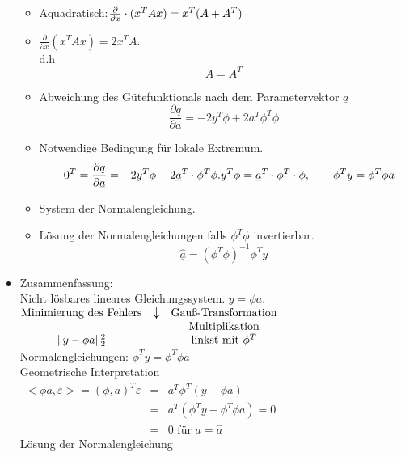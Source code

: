 \documentclass[ngerman]{tudscrreprt}
\begin{document}
\begin{itemize}
\begin{itemize}
\item Aquadratisch:$ \frac{\partial}{\partial{x} }\cdot(x^T A x) = x^T (A + A^T)\\
$ 
\item {} $\frac{\partial}{\partial{x}} (x^TAx)= 2 x^T A. $\\
d.h \begin{equation*} A= A^T\end{equation*}
\item Abweichung des Gütefunktionals nach dem Parametervektor $\underline{a}$ 
\begin{equation*}
\frac{\partial{q}}{\partial{a}} = -2 y^T \phi + 2 a^T \phi^T \phi
\end{equation*}
\item Notwendige Bedingung für lokale Extremum.
\begin{equation*}
\quad0^T =\frac{\partial{q}}{\partial{\underline{a}}} = -2y^T \phi + 2\underline{a}^T \cdot \phi^T \phi.\\
y^T \phi = \underline{a}^T \cdot \phi^T \cdot \phi,\qquad \phi^T y = \phi^T \phi a
\end{equation*}
\item System der Normalengleichung.\\
\item Lösung der Normalengleichungen falls $\phi^T \phi$ invertierbar. \\
\begin{equation*}
\hat{\underline{a}} = (\phi^T\phi)^{-1} \phi^T y
\end{equation*}
\end{itemize}
\item Zusammenfassung:\\
Nicht lösbares lineares Gleichungssystem. $y=\phi a.$\\
$
\begin{matrix}
\text{Minimierung des Fehlers} & \mathlarger{\mathlarger{\downarrow}}& \text{Gauß-Transformation} \\
					    & &				\text{Multiplikation}\\
		\|y-\phi \underline{a}\|_2^2 && \text{linkst mit } \phi^T 
\end{matrix}
$
\\
Normalengleichungen: $ \phi^T y = \phi^T \phi \underline{a}$\\
Geometrische Interpretation\\

$
\begin{matrix}
<\phi \underline{a}, \underline{\varepsilon} > = (\phi, \underline{a})^T\underline{ \varepsilon }& = &\underline{a}^T \phi^T (y-\phi \underline{a})\\
&=& a^T (\phi^T y - \phi^T \phi a) = 0 \\
&=& 0 \text{ für } a= \hat{a}
\end{matrix}
$\\ Lösung der Normalengleichung\\


\end{itemize}
\end{document}
